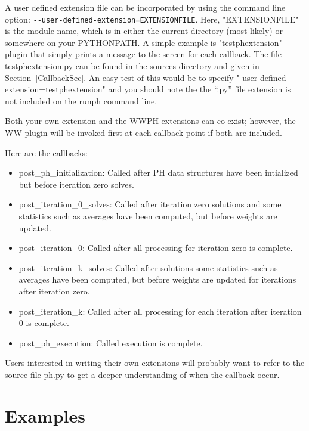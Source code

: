 A user defined extension file can be incorporated by using the command line
option: \verb|--user-defined-extension=EXTENSIONFILE|. Here, "EXTENSIONFILE" is
the module name, which is in either the current directory (most likely) or
somewhere on your PYTHONPATH. A simple example is "testphextension" plugin that
simply prints a message to the screen for each callback. The file
testphextension.py can be found in the sources directory and given in
Section~\ref{CallbackSec}. An easy test of this would be to specify
"-user-defined-extension=testphextension" and you should note the the ``.py''
file extension is not included on the runph command line.

Both your own extension and the WWPH extensions can co-exist; however, the WW
plugin will be invoked first at each callback point if both are included.

Here are the callbacks:
\begin{itemize}
  \item post\_ph\_initialization: Called after PH data structures have been
  intialized but before iteration zero solves.

  \item post\_iteration\_0\_solves: Called after iteration zero solutions and
  some statistics such as averages have been computed, but before weights are
  updated.

  \item post\_iteration\_0: Called after all processing for iteration zero is
  complete.

  \item post\_iteration\_k\_solves: Called after solutions some statistics such
  as averages have been computed, but before weights are updated for iterations
  after iteration zero.

  \item post\_iteration\_k: Called after all processing for each iteration after
  iteration 0 is complete.

  \item post\_ph\_execution: Called execution is complete.
\end{itemize}

Users interested in writing their own extensions will probably want to refer to
the source file ph.py to get a deeper understanding of when the callback occur.

\section{Examples \label{ExampleSec}}

